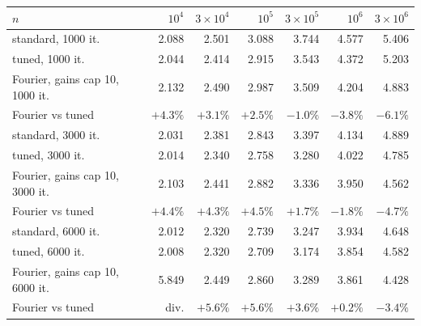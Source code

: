 \begin{tabular}{lrrrrrr}\toprule
$n$ & $10^4$ & $3\times10^4$ & $10^5$ & $3\times10^5$ & $10^6$ & $3\times10^6$\\\midrule
standard, 1000 it. & 2.088 & 2.501 & 3.088 & 3.744 & 4.577 & 5.406\\
tuned, 1000 it. & 2.044 & 2.414 & 2.915 & 3.543 & 4.372 & 5.203\\
Fourier, gains cap 10, 1000 it. & 2.132 & 2.490 & 2.987 & 3.509 & 4.204 & 4.883\\
\quad Fourier vs tuned & $+4.3\%$ & $+3.1\%$ & $+2.5\%$ & $-1.0\%$ & $-3.8\%$ & $-6.1\%$\\[2pt]
standard, 3000 it. & 2.031 & 2.381 & 2.843 & 3.397 & 4.134 & 4.889\\
tuned, 3000 it. & 2.014 & 2.340 & 2.758 & 3.280 & 4.022 & 4.785\\
Fourier, gains cap 10, 3000 it. & 2.103 & 2.441 & 2.882 & 3.336 & 3.950 & 4.562\\
\quad Fourier vs tuned & $+4.4\%$ & $+4.3\%$ & $+4.5\%$ & $+1.7\%$ & $-1.8\%$ & $-4.7\%$\\[2pt]
standard, 6000 it. & 2.012 & 2.320 & 2.739 & 3.247 & 3.934 & 4.648\\
tuned, 6000 it. & 2.008 & 2.320 & 2.709 & 3.174 & 3.854 & 4.582\\
Fourier, gains cap 10, 6000 it. & 5.849 & 2.449 & 2.860 & 3.289 & 3.861 & 4.428\\
\quad Fourier vs tuned & div. & $+5.6\%$ & $+5.6\%$ & $+3.6\%$ & $+0.2\%$ & $-3.4\%$\\
\bottomrule\end{tabular}
